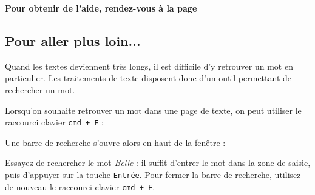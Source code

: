 \textbf{Pour obtenir de l'aide, rendez-vous à la page \pageref{correction_texte01}}


\subsection{Pour aller plus loin...}  

Quand les textes deviennent très longs, il est difficile d'y retrouver un mot en particulier. Les traitements de texte disposent donc d'un outil permettant de rechercher un mot. 

Lorsqu'on souhaite retrouver un mot dans une page de texte, on peut utiliser le raccourci clavier \texttt{cmd + F} :   


Une barre de recherche s'ouvre alors en haut de la fenêtre :


Essayez de rechercher le mot \emph{Belle} : il suffit d'entrer le mot dans la zone de saisie, puis d'appuyer sur la touche \texttt{Entrée}. Pour fermer la barre de recherche, utilisez de nouveau le raccourci clavier \texttt{cmd + F}.   










